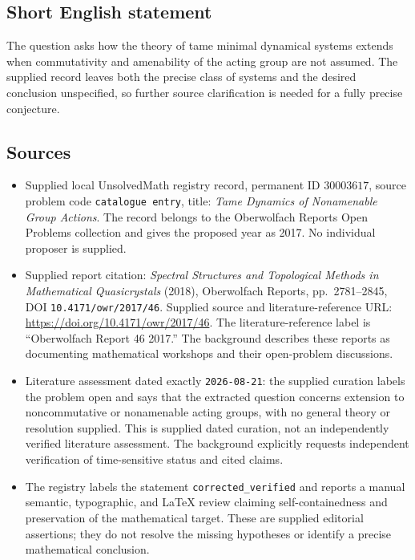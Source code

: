 \documentclass[11pt]{article}
\begin{document}
\subsection{Short English statement}
The question asks how the theory of tame minimal dynamical systems extends when commutativity and amenability of the acting group are not assumed. The supplied record leaves both the precise class of systems and the desired conclusion unspecified, so further source clarification is needed for a fully precise conjecture.
\subsection{Sources}
\begin{itemize}
\item Supplied local UnsolvedMath registry record, permanent ID \(30003617\), source problem code \texttt{catalogue entry}, title: \emph{Tame Dynamics of Nonamenable Group Actions}. The record belongs to the Oberwolfach Reports Open Problems collection and gives the proposed year as 2017. No individual proposer is supplied.
\item Supplied report citation: \emph{Spectral Structures and Topological Methods in Mathematical Quasicrystals} (2018), Oberwolfach Reports, pp.~2781--2845, DOI \texttt{10.4171/owr/2017/46}. Supplied source and literature-reference URL: \url{https://doi.org/10.4171/owr/2017/46}. The literature-reference label is ``Oberwolfach Report 46 2017.'' The background describes these reports as documenting mathematical workshops and their open-problem discussions.
\item Literature assessment dated exactly \texttt{2026-08-21}: the supplied curation labels the problem open and says that the extracted question concerns extension to noncommutative or nonamenable acting groups, with no general theory or resolution supplied. This is supplied dated curation, not an independently verified literature assessment. The background explicitly requests independent verification of time-sensitive status and cited claims.
\item The registry labels the statement \texttt{corrected\_verified} and reports a manual semantic, typographic, and LaTeX review claiming self-containedness and preservation of the mathematical target. These are supplied editorial assertions; they do not resolve the missing hypotheses or identify a precise mathematical conclusion.
\end{itemize}
\end{document}
